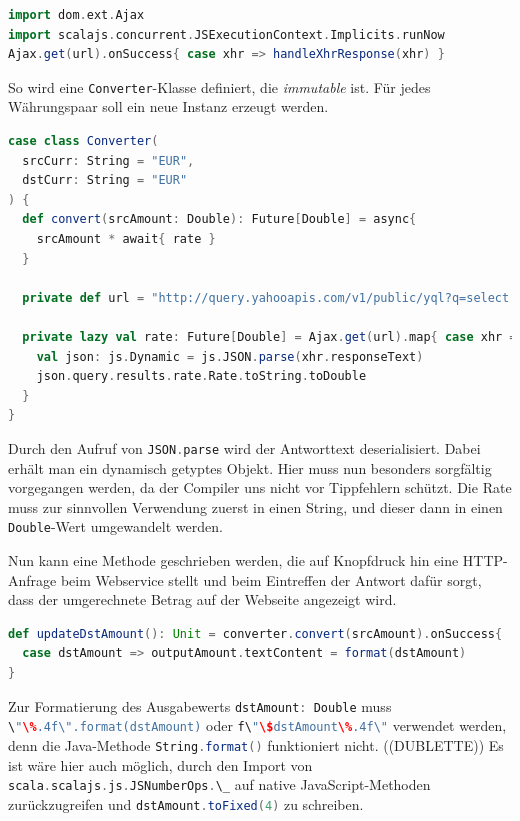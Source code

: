 \documentclass[a4paper, 12pt, hidelinks, listof=totoc, listoftables=totoc, bibliography=totoc]{scrreprt}
\newcommand{\scala}[1]{\lstinline[language=Scala, style=inline]|#1|}
\begin{document}
\begin{lstlisting}[language=Scala, caption={Futures-basierter HTTP-Aufruf mit Scala.js-Bequemlichkeitsmethode.}]
import dom.ext.Ajax
import scalajs.concurrent.JSExecutionContext.Implicits.runNow
Ajax.get(url).onSuccess{ case xhr => handleXhrResponse(xhr) }
\end{lstlisting}

So wird eine \scala{Converter}-Klasse definiert, die \emph{immutable} ist. Für jedes Währungspaar soll ein neue Instanz erzeugt werden.

\begin{lstlisting}[language=Scala, caption={Der Währungsumrechner.}]
case class Converter(
  srcCurr: String = "EUR",
  dstCurr: String = "EUR"
) {
  def convert(srcAmount: Double): Future[Double] = async{
    srcAmount * await{ rate }
  }

  private def url = "http://query.yahooapis.com/v1/public/yql?q=select * from yahoo.finance.xchange where pair in ('" + srcCurr + dstCurr + "')&format=json&env=store://datatables.org/alltableswithkeys"

  private lazy val rate: Future[Double] = Ajax.get(url).map{ case xhr =>
    val json: js.Dynamic = js.JSON.parse(xhr.responseText)
    json.query.results.rate.Rate.toString.toDouble
  }
}
\end{lstlisting}

Durch den Aufruf von \scala{JSON.parse} wird der Antworttext deserialisiert. Dabei erhält man ein dynamisch getyptes Objekt. Hier muss nun besonders sorgfältig vorgegangen werden, da der Compiler uns nicht vor Tippfehlern schützt. Die Rate muss zur sinnvollen Verwendung zuerst in einen String, und dieser dann in einen \scala{Double}-Wert umgewandelt werden.

Nun kann eine Methode geschrieben werden, die auf Knopfdruck hin eine HTTP-Anfrage beim Webservice stellt und beim Eintreffen der Antwort dafür sorgt, dass der umgerechnete Betrag auf der Webseite angezeigt wird.

\begin{lstlisting}[language=Scala, style=snippet]
def updateDstAmount(): Unit = converter.convert(srcAmount).onSuccess{
  case dstAmount => outputAmount.textContent = format(dstAmount)
}
\end{lstlisting}

Zur Formatierung des Ausgabewerts \scala{dstAmount: Double} muss \scala{\"\%.4f\".format(dstAmount)} oder \scala{f\"\$dstAmount\%.4f\"} verwendet werden, denn die Java-Methode \scala{String.format()} funktioniert nicht. ((DUBLETTE)) Es ist wäre hier auch möglich, durch den Import von \scala{scala.scalajs.js.JSNumberOps.\_}
auf native JavaScript-Methoden zurückzugreifen und \scala{dstAmount.toFixed(4)} zu schreiben.
\end{document}
